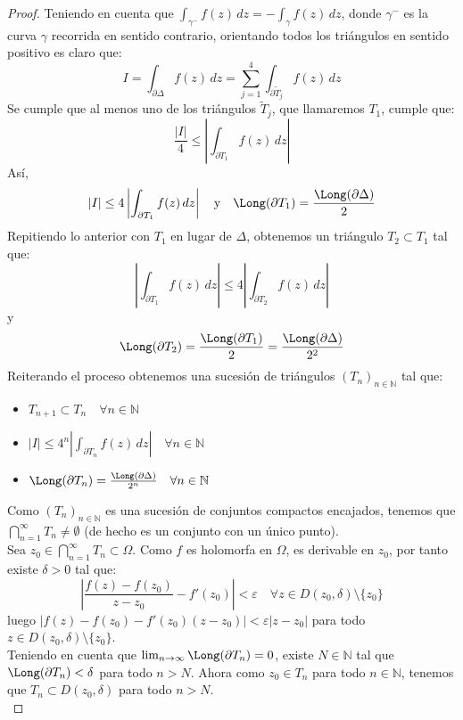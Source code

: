 \begin{proof}
    Teniendo en cuenta que $\int_{\gamma^-} f(z) \, dz = -\int_{\gamma} f(z) \, dz$, donde $\gamma^-$ es la curva $\gamma$ recorrida en sentido contrario, orientando todos los triángulos en sentido positivo es claro que:
    \[
        I = \int_{\partial \Delta} f(z) \, dz = \sum_{j=1}^{4} \int_{\partial \tilde{T}_j} f(z) \, dz
    \]
    Se cumple que al menos uno de los triángulos $\tilde{T}_j$, que llamaremos $T_1$, cumple que:
    \[
        \frac{|I|}{4} \leq \left| \int_{\partial T_1} f(z) \, dz \right|
    \]
    Así, 
    \[
        |I| \leq 4 \left| \int_{\partial T_1} f(z) \, dz \right| \quad \text{y} \quad \Long(\partial T_1) = \frac{\Long(\partial \Delta)}{2}
    \]
    Repitiendo lo anterior con $T_1$ en lugar de $\Delta$, obtenemos un triángulo $T_2 \subset T_1$ tal que:
    \[
        \left| \int_{\partial T_1} f(z) \, dz \right| \leq 4 \left| \int_{\partial T_2} f(z) \, dz \right| 
    \]
    y
    \[
        \Long(\partial T_2) = \frac{\Long(\partial T_1)}{2} = \frac{\Long(\partial \Delta)}{2^2}
    \]
    Reiterando el proceso obtenemos una sucesión de triángulos $(T_n)_{n \in \mathbb{N}}$ tal que:
    \begin{itemize}
        \item $T_{n+1} \subset T_n \quad \forall n \in \mathbb{N}$
        \item $|I| \leq 4^n \left| \int_{\partial T_n} f(z) \, dz \right| \quad \forall n \in \mathbb{N}$
        \item $\Long(\partial T_n) = \frac{\Long(\partial \Delta)}{2^n} \quad \forall n \in \mathbb{N}$
    \end{itemize}
    Como $(T_n)_{n \in \mathbb{N}}$ es una sucesión de conjuntos compactos encajados, tenemos que $\bigcap_{n=1}^{\infty} T_n \neq \emptyset$ (de hecho es un conjunto con un único punto).\\
    Sea $z_0 \in \bigcap_{n=1}^{\infty} T_n \subset \Omega$. Como $f$ es holomorfa en $\Omega$, es derivable en $z_0$, por tanto existe $\delta > 0$ tal que:
    \[
        \left| \frac{f(z) - f(z_0)}{z - z_0} - f'(z_0) \right| < \varepsilon \quad \forall z \in D(z_0, \delta) \setminus \{z_0\}
    \]
    luego $|f(z) - f(z_0) - f'(z_0)(z - z_0)| < \varepsilon |z - z_0|$ para todo $z \in D(z_0, \delta)\setminus \{z_0\}$.\\
    Teniendo en cuenta que $\lim_{n \to \infty} \Long(\partial T_n) = 0$, existe $N \in \mathbb{N}$ tal que $\Long(\partial T_n) < \delta$ para todo $n > N$. Ahora como $z_0 \in T_n$ para todo $n \in \mathbb{N}$, tenemos que $T_n \subset D(z_0, \delta)$ para todo $n > N$.\\

\end{proof}
